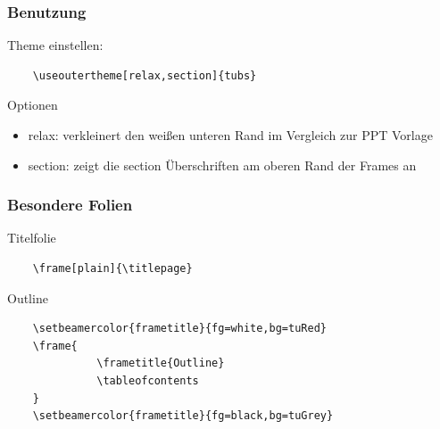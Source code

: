 \documentclass[table,hyperref={bookmarksopen=false}]{beamer}
\begin{document}
\begin{frame}[fragile]
  \frametitle{Benutzung}
  Theme einstellen:
  \begin{verbatim}
    \useoutertheme[relax,section]{tubs}
  \end{verbatim}
  \begin{block}{Optionen}
  \begin{itemize}
    \item relax: verkleinert den weißen unteren Rand im Vergleich zur PPT Vorlage
    \item section: zeigt die section Überschriften am oberen Rand der Frames an
  \end{itemize}
  \end{block}
\end{frame}

\begin{frame}[fragile]
  \frametitle{Besondere Folien}
  \begin{block}{Titelfolie}
  \begin{verbatim}
    \frame[plain]{\titlepage}
  \end{verbatim}
  \end{block}
  \begin{block}{Outline}
  \begin{verbatim}
    \setbeamercolor{frametitle}{fg=white,bg=tuRed}
    \frame{
              \frametitle{Outline}
              \tableofcontents
    }
    \setbeamercolor{frametitle}{fg=black,bg=tuGrey}
  \end{verbatim}
  \end{block}
\end{frame}
\end{document}

